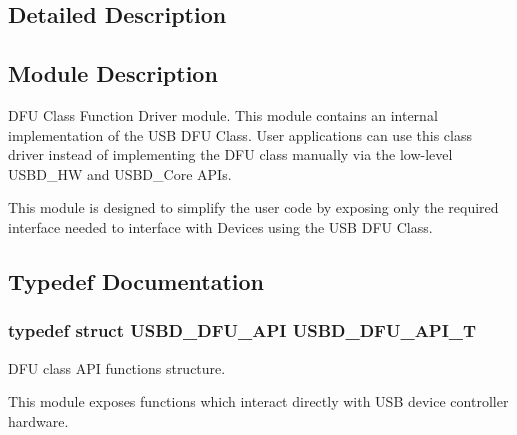 \subsection{Detailed Description}
\hypertarget{group__USBD__MSC_Sec_MSCModDescription}{}\subsection{Module Description}\label{group__USBD__MSC_Sec_MSCModDescription}
D\+FU Class Function Driver module. This module contains an internal implementation of the U\+SB D\+FU Class. User applications can use this class driver instead of implementing the D\+FU class manually via the low-\/level U\+S\+B\+D\+\_\+\+HW and U\+S\+B\+D\+\_\+\+Core A\+P\+Is.

This module is designed to simplify the user code by exposing only the required interface needed to interface with Devices using the U\+SB D\+FU Class. 

\subsection{Typedef Documentation}
\subsubsection[{\texorpdfstring{U\+S\+B\+D\+\_\+\+D\+F\+U\+\_\+\+A\+P\+I\+\_\+T}{USBD_DFU_API_T}}]{\setlength{\rightskip}{0pt plus 5cm}typedef struct {\bf U\+S\+B\+D\+\_\+\+D\+F\+U\+\_\+\+A\+PI}  {\bf U\+S\+B\+D\+\_\+\+D\+F\+U\+\_\+\+A\+P\+I\+\_\+T}}\hypertarget{group__USBD__DFU_gadf9281f8af1223053e3ccf48e26ac80d}{}\label{group__USBD__DFU_gadf9281f8af1223053e3ccf48e26ac80d}


D\+FU class A\+PI functions structure.

This module exposes functions which interact directly with U\+SB device controller hardware. 

